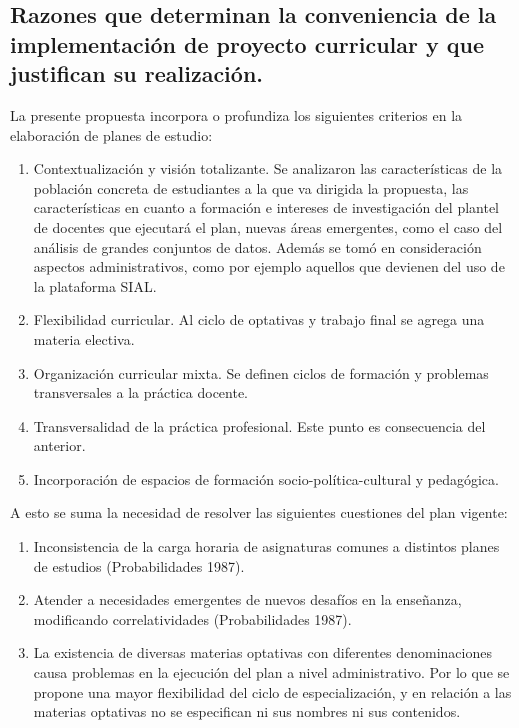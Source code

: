 \documentclass[a4paper, 12pt]{article}
\begin{document}
\subsection{Razones que determinan la conveniencia de la implementación de proyecto curricular  y que justifican su realización.}

La presente propuesta incorpora o profundiza los siguientes criterios en la elaboración de planes de estudio: 

\begin{enumerate}
\item  Contextualización y visión totalizante. Se analizaron las características de la población concreta de estudiantes a la que va dirigida la propuesta, las características en cuanto a formación e intereses de investigación del plantel de docentes que ejecutará el plan, nuevas áreas emergentes, como el caso del análisis de grandes conjuntos de datos. Además se tomó en consideración aspectos administrativos, como por ejemplo aquellos que devienen del uso de la plataforma SIAL. 
\item Flexibilidad curricular. Al ciclo de optativas y trabajo final se agrega una materia electiva.
\item Organización curricular mixta. Se definen ciclos de formación y problemas transversales a la práctica docente. 
\item Transversalidad de la práctica profesional. Este punto es consecuencia del anterior.
\item Incorporación de espacios de formación socio-política-cultural y pedagógica.
\end{enumerate}

A esto se suma la necesidad de resolver las siguientes cuestiones  del plan vigente: 

\begin{enumerate}
\item Inconsistencia de la carga horaria de asignaturas  comunes a distintos planes de estudios (Probabilidades 1987).

\item Atender a necesidades emergentes de nuevos desafíos en la enseñanza, modificando correlatividades (Probabilidades 1987). 

\item La existencia de diversas materias optativas con diferentes denominaciones causa problemas en la ejecución del plan a nivel administrativo. Por lo que se propone una mayor flexibilidad del ciclo de especialización, y en relación a las materias optativas no se especifican ni sus nombres ni sus contenidos. 
\end{enumerate}
\end{document}
